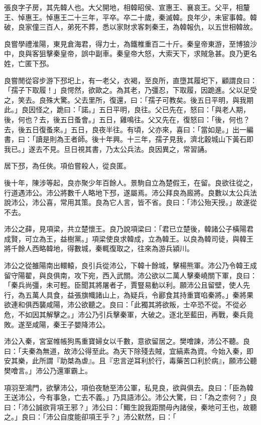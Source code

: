 
\begin{pinyinscope}
張良字子房，其先韓人也。大父開地，相韓昭侯、宣惠王、襄哀王。父平，相釐王、悼惠王。悼惠王二十三年，平卒。卒二十歲，秦滅韓。良年少，未宦事韓。韓破，良家僮三百人，弟死不葬，悉以家財求客刺秦王，為韓報仇，以五世相韓故。

良嘗學禮淮陽，東見倉海君，得力士，為鐵椎重百二十斤。秦皇帝東游，至博狼沙中，良與客狙擊秦皇帝，誤中副車。秦皇帝大怒，大索天下，求賊急甚。良乃更名姓，亡匿下邳。

良嘗閒從容步游下邳圯上，有一老父，衣褐，至良所，直墮其履圯下，顧謂良曰：「孺子下取履！」良愕然，欲歐之。為其老，乃彊忍，下取履，因跪進。父以足受之，笑去。良殊大驚。父去里所，復還，曰：「孺子可教矣。後五日平明，與我期此。」良因怪之，跪曰：「諾。」五日平明，良往。父已先在，怒曰：「與老人期，後，何也？去，後五日蚤會。」五日，雞鳴往。父又先在，復怒曰：「後，何也？去，後五日復蚤來。」五日，良夜半往。有頃，父亦來，喜曰：「當如是。」出一編書，曰：「讀是則為王者師。後十年興。十三年，孺子見我，濟北穀城山下黃石即我已。」遂去不見。旦日視其書，乃太公兵法。良因異之，常習誦。

居下邳，為任俠。項伯嘗殺人，從良匿。

後十年，陳涉等起，良亦聚少年百餘人。景駒自立為楚假王，在留。良欲往從之，行道遇沛公。沛公將數千人略地下邳，遂屬焉。沛公拜良為廄將。良數以太公兵法說沛公，沛公喜，常用其策。良為它人言，皆不省。良曰：「沛公殆天授。」故遂從不去。

沛公之薛，見項梁，共立楚懷王。良乃說項梁曰：「君已立楚後，韓諸公子橫陽君成賢，可立為王，益樹黨。」項梁使良求韓成，立為韓王。以良為韓司徒，與韓王將千餘人西略韓地，得數城，秦輒復取之，往來為游兵潁川。

沛公之從雒陽南出轘轅，良引兵從沛公，下韓十餘城，擊楊熊軍。沛公乃令韓王成留守陽翟，與良俱南，攻下宛，西入武關。沛公欲以二萬人擊秦嶢關下軍，良曰：「秦兵尚彊，未可輕。臣聞其將屠者子，賈豎易動以利。願沛公且留壁，使人先行，為五萬人具食，益張旗幟諸山上，為疑兵，令酈食其持重寶啗秦將。」秦將果欲連和俱西襲咸陽，沛公欲聽之。良曰：「此獨其將欲叛，士卒恐不從。不從必危，不如因其解擊之。」沛公乃引兵擊秦軍，大破之。逐北至藍田，再戰，秦兵竟敗。遂至咸陽，秦王子嬰降沛公。

沛公入秦，宮室帷帳狗馬重寶婦女以千數，意欲留居之。樊噲諫，沛公不聽。良曰：「夫秦為無道，故沛公得至此。為天下除殘去賊，宜縞素為資。今始入秦，即安其樂，此所謂『助桀為虐』。且『忠言逆耳利於行，毒藥苦口利於病』，願沛公聽樊噲言。」沛公乃還軍霸上。

項羽至鴻門，欲擊沛公，項伯夜馳至沛公軍，私見良，欲與俱去。良曰：「臣為韓王送沛公，今有事急，亡去不義。」乃具語沛公。沛公大驚，曰：「為之柰何？」良曰：「沛公誠欲背項王邪？」沛公曰：「鯫生說我距關毋內諸侯，秦地可王也，故聽之。」良曰：「沛公自度能卻項王乎？」沛公默然，曰：「


\end{pinyinscope}
